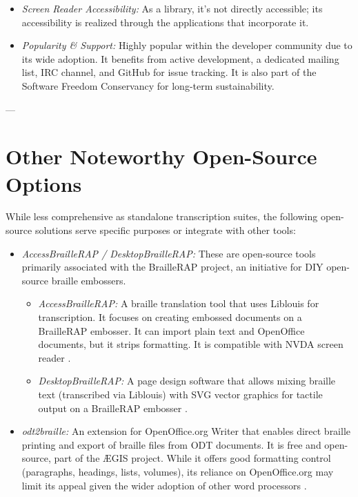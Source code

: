 \begin{itemize}
\begin{itemize}
        \item \emph{Screen Reader Accessibility:} As a library, it's not directly accessible; its accessibility is realized through the applications that incorporate it.
        \item \emph{Popularity \& Support:} Highly popular within the developer community due to its wide adoption. It benefits from active development, a dedicated mailing list, IRC channel, and GitHub for issue tracking. It is also part of the Software Freedom Conservancy for long-term sustainability.
    \end{itemize}
\end{itemize}

---

\section{Other Noteworthy Open-Source Options}
\label{sec:braille-other-open-source}
While less comprehensive as standalone transcription suites, the following open-source solutions serve specific purposes or integrate with other tools:

\begin{itemize}
    \item \emph{AccessBrailleRAP / DesktopBrailleRAP:} These are open-source tools primarily associated with the BrailleRAP project, an initiative for DIY open-source braille embossers.
    \begin{itemize}
        \item \emph{AccessBrailleRAP:} A braille translation tool that uses Liblouis for transcription. It focuses on creating embossed documents on a BrailleRAP embosser. It can import plain text and OpenOffice documents, but it strips formatting. It is compatible with NVDA screen reader \cite{BrailleRAPAccess}.
        \item \emph{DesktopBrailleRAP:} A page design software that allows mixing braille text (transcribed via Liblouis) with SVG vector graphics for tactile output on a BrailleRAP embosser \cite{BrailleRAPDesktop}.
    \end{itemize}
    \item \emph{odt2braille:} An extension for OpenOffice.org Writer that enables direct braille printing and export of braille files from ODT documents. It is free and open-source, part of the ÆGIS project. While it offers good formatting control (paragraphs, headings, lists, volumes), its reliance on OpenOffice.org may limit its appeal given the wider adoption of other word processors \cite{odt2braille}.
\end{itemize}


